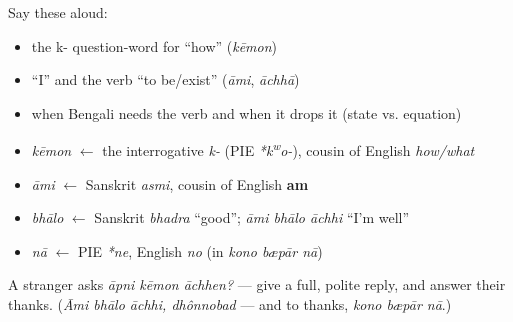 \begin{cousinweb}
Say these aloud:

\begin{itemize}
\raggedright
  \item the k- question-word for \textquotedblleft{}how\textquotedblright{} (\emph{kēmon})
  \item \textquotedblleft{}I\textquotedblright{} and the verb \textquotedblleft{}to be/exist\textquotedblright{} (\emph{āmi}, \emph{āchhā})
  \item when Bengali needs the verb and when it drops it (state vs. equation)
\end{itemize}
\end{cousinweb}

\begin{grammarlens}[title={What you've built — roots you now carry}]
\begin{itemize}
\raggedright
  \item \emph{kēmon} $\leftarrow$ the interrogative \emph{k-} (PIE \emph{*k\textsuperscript{w}o-}), cousin of English \emph{how/what}
  \item \emph{āmi} $\leftarrow$ Sanskrit \emph{asmi}, cousin of English \textbf{am}
  \item \emph{bhālo} $\leftarrow$ Sanskrit \emph{bhadra} \textquotedblleft{}good\textquotedblright{}; \emph{āmi bhālo āchhi} \textquotedblleft{}I'm well\textquotedblright{}
  \item \emph{nā} $\leftarrow$ PIE \emph{*ne}, English \emph{no} (in \emph{kono bæpār nā})
\end{itemize}
\end{grammarlens}

\begin{tcolorbox}[breakable,colback=teal!4,colframe=teal!35!black,title={Before you move on}]
A stranger asks \emph{āpni kēmon āchhen?} — give a full, polite reply, and answer their thanks. (\emph{Āmi bhālo āchhi, dhônnobad} — and to thanks, \emph{kono bæpār nā}.)
\end{tcolorbox}
